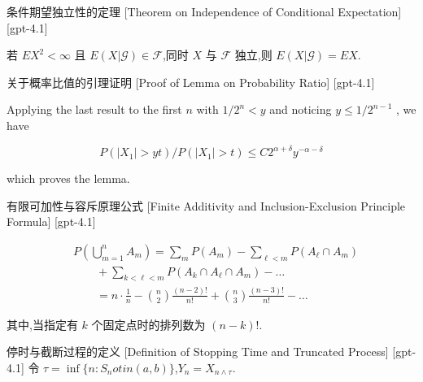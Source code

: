 \documentclass[UTF8]{ctexart}
\begin{document}
    
    
    \begin{thm}
        {条件期望独立性的定理}
        [Theorem on Independence of Conditional Expectation]
        [gpt-4.1]
        
若 $E X^2 < \infty$ 且 $E(X|\mathcal{G}) \in \mathcal{F}$,同时 $X$ 与 $\mathcal{F}$ 独立,则 $E(X|\mathcal{G}) = E X$.

    \end{thm}
    
    
    
    \begin{lma}
        {关于概率比值的引理证明}
        [Proof of Lemma on Probability Ratio]
        [gpt-4.1]
        
Applying the last result to the first $n$ with $1 / 2 ^ { n } < y$ and noticing $y \leq 1 / 2 ^ { n - 1 }$ , we have

\[
P ( | X _ { 1 } | > y t ) / P ( | X _ { 1 } | > t ) \leq C 2 ^ { \alpha + \delta } y ^ { - \alpha - \delta }
\]

which proves the lemma.

    \end{lma}
    
    
    
    \begin{thm}
        {有限可加性与容斥原理公式}
        [Finite Additivity and Inclusion-Exclusion Principle Formula]
        [gpt-4.1]
        
\[
\begin{array}{rl}
& P \left( \bigcup_{m=1}^{n} A_{m} \right) = \displaystyle\sum_{m} P(A_{m}) - \sum_{\ell < m} P(A_{\ell} \cap A_{m}) \\
& \qquad + \displaystyle\sum_{k<\ell<m} P(A_{k} \cap A_{\ell} \cap A_{m}) - \ldots \\
& \qquad = n \cdot \frac{1}{n} - {\binom{n}{2}} \frac{(n-2)!}{n!} + {\binom{n}{3}} \frac{(n-3)!}{n!} - \ldots
\end{array}
\]

其中,当指定有 $k$ 个固定点时的排列数为 $(n-k)!$.

    \end{thm}
    
    
    
    \begin{dfn}
        {停时与截断过程的定义}
        [Definition of Stopping Time and Truncated Process]
        [gpt-4.1]
        令 $\tau = \operatorname*{inf}\{n : S_{n} 
otin (a, b)\}$,$Y_{n} = X_{n \wedge \tau}$.
    \end{dfn}
    
\end{document}
